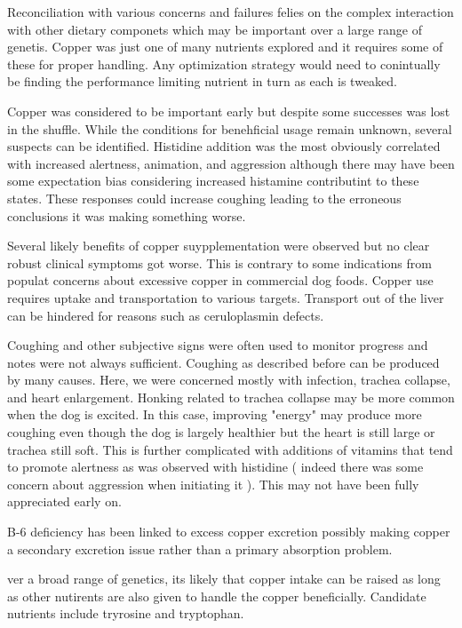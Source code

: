 \documentclass[aps,secnumarabic,balancelastpage,amsmath,amssymb,nofootinbib]{revtex4}
\begin{document}
Reconciliation with various concerns and failures
felies on the complex interaction with other dietary componets
which may be important over a large range of genetis. 
Copper was just one of many nutrients explored and
it requires some of these for proper handling.
Any optimization strategy would need to conintually
be finding the performance limiting nutrient
in turn as each is tweaked. 

Copper was considered to be important early but despite
some successes was lost in the shuffle. While the conditions
for benehficial usage remain unknown, several suspects
can be identified. Histidine addition was the most
obviously correlated with increased
alertness, animation, and aggression although there
may have been some expectation bias considering increased
histamine contributint to these states. These responses
could increase coughing leading to the erroneous
conclusions it was making something worse.    


Several likely benefits of copper suypplementation were observed
but no clear robust clinical symptoms got worse.
This is contrary to some indications from populat concerns
about excessive copper in commercial dog foods. 
Copper use requires uptake and transportation to 
various targets. Transport out of the liver can be hindered
for reasons such as ceruloplasmin defects.

Coughing and other subjective signs were often used
to monitor progress and notes were not always sufficient.
Coughing as described before can be produced by many
causes. Here, we were concerned mostly with infection,
trachea collapse, and heart enlargement. Honking
related to trachea collapse may be more common when the
dog is excited. In this case, improving "energy" may
produce more coughing even though the dog is largely
healthier but the heart is still large or trachea
still soft. This is further complicated with additions
of vitamins that tend to promote alertness as was 
observed with histidine ( indeed there was some concern
about aggression when initiating it ). This may not
have been fully appreciated early on.  


B-6 deficiency has been linked to excess copper excretion \cite{PMID7814236}
possibly making copper a secondary excretion issue
rather than a primary absorption problem. 


ver a broad range of genetics, its likely that copper intake
can be raised as long as other nutirents are also given
to handle the copper beneficially.
Candidate nutrients include tryrosine and tryptophan.
\end{document}
